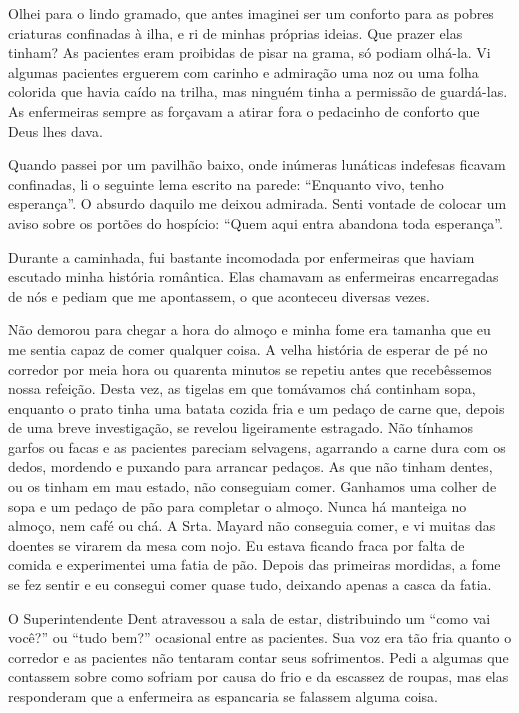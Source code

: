 Olhei para o lindo gramado, que antes imaginei ser um conforto para as
pobres criaturas confinadas à ilha, e ri de minhas próprias ideias. Que
prazer elas tinham? As pacientes eram proibidas de pisar na grama, só
podiam olhá-la. Vi algumas pacientes erguerem com carinho e admiração
uma noz ou uma folha colorida que havia caído na trilha, mas ninguém
tinha a permissão de guardá-las. As enfermeiras sempre as forçavam a
atirar fora o pedacinho de conforto que Deus lhes dava.

Quando
passei por um pavilhão baixo, onde inúmeras lunáticas indefesas ficavam
confinadas, li o seguinte lema escrito na parede: ``Enquanto vivo, tenho
esperança''. O absurdo daquilo me deixou admirada. Senti vontade de
colocar um aviso sobre os portões do hospício: ``Quem aqui entra
abandona toda esperança''.

Durante a caminhada, fui bastante incomodada por enfermeiras que haviam
escutado minha história romântica. Elas chamavam as enfermeiras
encarregadas de nós e pediam que me apontassem, o que aconteceu diversas
vezes.

Não demorou para chegar a hora do almoço e minha fome era tamanha que eu
me sentia capaz de comer qualquer coisa. A velha história de esperar de
pé no corredor por meia hora ou quarenta minutos se repetiu antes que
recebêssemos nossa refeição. Desta vez, as tigelas em que tomávamos chá
continham sopa, enquanto o prato tinha uma batata cozida fria e um
pedaço de carne que, depois de uma breve investigação, se revelou
ligeiramente estragado. Não tínhamos garfos ou facas e as pacientes
pareciam selvagens, agarrando a carne dura com os dedos, mordendo e
puxando para arrancar pedaços. As que não tinham dentes, ou os tinham em
mau estado, não conseguiam comer. Ganhamos uma colher de sopa e um
pedaço de pão para completar o almoço. Nunca há manteiga no almoço, nem
café ou chá. A Srta. Mayard não conseguia comer, e vi muitas das doentes
se virarem da mesa com nojo. Eu estava ficando fraca por falta de comida
e experimentei uma fatia de pão. Depois das primeiras mordidas, a fome
se fez sentir e eu consegui comer quase tudo, deixando apenas a casca da
fatia.

O Superintendente Dent atravessou a sala de estar, distribuindo um
``como vai você?'' ou ``tudo bem?'' ocasional entre as pacientes. Sua
voz era tão fria quanto o corredor e as pacientes não tentaram contar
seus sofrimentos. Pedi a algumas que contassem sobre como sofriam por
causa do frio e da escassez de roupas, mas elas responderam que a
enfermeira as espancaria se falassem alguma coisa.

